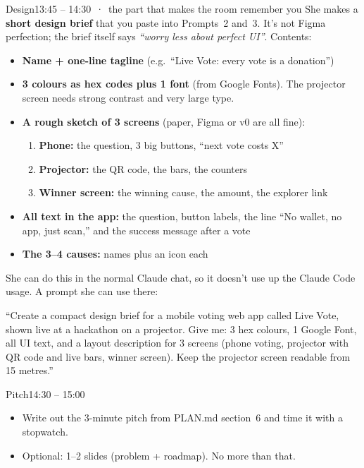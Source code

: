 \documentclass[11pt,a4paper]{article}
\begin{document}
\begin{taskbox}{Design}{13:45 – 14:30 \,·\, the part that makes the room remember you}
She makes a \textbf{short design brief} that you paste into Prompts~2 and~3. It's not Figma perfection; the brief itself says \emph{``worry less about perfect UI''}. Contents:
\begin{itemize}
  \item \textbf{Name + one-line tagline} (e.g.\ ``Live Vote: every vote is a donation'')
  \item \textbf{3 colours as hex codes plus 1 font} (from Google Fonts). The projector screen needs strong contrast and very large type.
  \item \textbf{A rough sketch of 3 screens} (paper, Figma or v0 are all fine):
  \begin{enumerate}
    \item \textbf{Phone:} the question, 3 big buttons, ``next vote costs X''
    \item \textbf{Projector:} the QR code, the bars, the counters
    \item \textbf{Winner screen:} the winning cause, the amount, the explorer link
  \end{enumerate}
  \item \textbf{All text in the app:} the question, button labels, the line ``No wallet, no app, just scan,'' and the success message after a vote
  \item \textbf{The 3–4 causes:} names plus an icon each
\end{itemize}
She can do this in the normal Claude chat, so it doesn't use up the Claude Code usage. A prompt she can use there:
\begin{promptbox}
``Create a compact design brief for a mobile voting web app called Live Vote, shown live at a hackathon on a projector. Give me: 3 hex colours, 1 Google Font, all UI text, and a layout description for 3 screens (phone voting, projector with QR code and live bars, winner screen). Keep the projector screen readable from 15 metres.''
\end{promptbox}
\end{taskbox}

\begin{taskbox}{Pitch}{14:30 – 15:00}
\begin{itemize}
  \item Write out the 3-minute pitch from PLAN.md section~6 and time it with a stopwatch.
  \item Optional: 1–2 slides (problem + roadmap). No more than that.
\end{itemize}
\end{taskbox}
\end{document}
